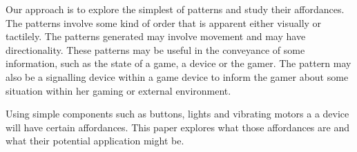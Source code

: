\documentclass{chi-ext}
\begin{document}




Our approach is to explore the simplest of patterns and study their affordances. 
The patterns involve some kind of order that is apparent either visually or tactilely. The patterns generated may involve movement and may have directionality. These patterns may be useful in the conveyance of some information, such as the state of a game, a device or the gamer. The pattern may also be a signalling device within a game device to inform the gamer about some situation within her gaming or external environment.



Using simple components such as buttons, lights and vibrating motors a a device will have certain affordances. This paper explores what those affordances are and what their potential application might be. 
\end{document}
